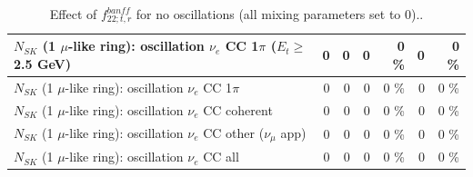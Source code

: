 \begin{table}
\begin{tabular}{| l | r | r | r  r | r  r |}
$N_{SK}$ (1 $\mu$-like ring): oscillation $\nu_e$ CC 1$\pi$ ($E_{t} \geq$ 2.5 GeV) &               0 &               0 &               0 &        0 \%  &               0 &        0 \%  \\ 
\hline
                     $N_{SK}$ (1 $\mu$-like ring): oscillation $\nu_e$ CC 1$\pi$ &               0 &               0 &               0 &        0 \%  &               0 &        0 \%  \\ 
                   $N_{SK}$ (1 $\mu$-like ring): oscillation $\nu_e$ CC coherent &               0 &               0 &               0 &        0 \%  &               0 &        0 \%  \\ 
      $N_{SK}$ (1 $\mu$-like ring): oscillation $\nu_e$ CC other ($\nu_\mu$ app) &               0 &               0 &               0 &        0 \%  &               0 &        0 \%  \\ 
                       $N_{SK}$ (1 $\mu$-like ring): oscillation $\nu_e$  CC all &               0 &               0 &               0 &        0 \%  &               0 &        0 \%  \\ 
\hline
\hline
\end{tabular}
\caption{ Effect of $f_{22; t, r}^{banff}$ for no oscillations (all mixing parameters set to 0).. }
\label{tab:num_banff_cc1piE1_1RmuT_3f_osc_t13:0}
\end{table}
\clearpage
